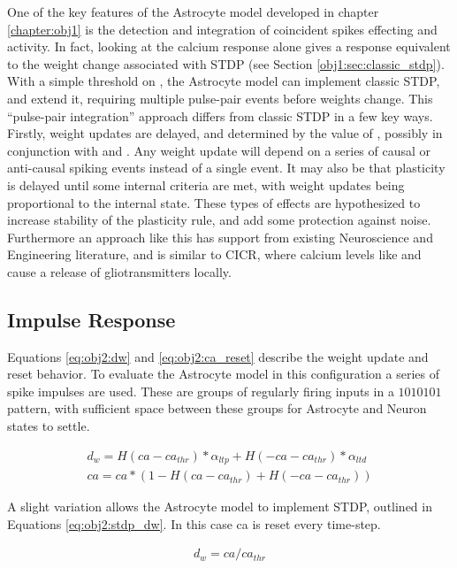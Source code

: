 One of the key features of the Astrocyte model developed in chapter
\ref{chapter:obj1} is the detection and integration of coincident spikes
effecting \ipt and \kp activity. In fact, looking at the calcium response alone
gives a response equivalent to the weight change associated with STDP (see
Section \ref{obj1:sec:classic_stdp}). With a simple threshold on \ca, the
Astrocyte model can implement classic STDP, and extend it, requiring multiple
pulse-pair events before weights change. This ``pulse-pair 
integration'' approach differs from classic STDP in a few key ways. Firstly,
weight updates are delayed, and determined by the value of \ca, possibly in
conjunction with \ipt and \kp. Any weight update will depend on a series of
causal or anti-causal spiking events instead of a single event. It may also be
that plasticity is delayed until some internal criteria are met, with weight
updates being proportional to the internal state. These types of effects are
hypothesized to increase stability of the plasticity rule, and add some
protection against noise. Furthermore an approach like this has support from
existing Neuroscience and Engineering literature, and is similar to CICR, where
calcium levels like and cause a release of gliotransmitters locally.

\subsection{Impulse Response}
Equations \ref{eq:obj2:dw} and \ref{eq:obj2:ca_reset}
describe the weight update and \ca reset behavior. To evaluate the Astrocyte
model in this configuration a series of spike impulses are used. These are
groups of regularly firing inputs in a $1010101$ pattern, with sufficient space
between these groups for Astrocyte and Neuron states to settle.

\begin{align}
  d_w = H(ca - ca_{thr}) * \alpha_{ltp} + H(-ca - ca_{thr}) *
  \alpha_{ltd} \label{eq:obj2:dw} \\
  ca = ca * (1 - H(ca - ca_{thr}) +  H(-ca - ca_{thr})) \label{eq:obj2:ca_reset}
\end{align}

A slight variation allows the Astrocyte model to implement STDP, outlined in
Equations \ref{eq:obj2:stdp_dw}. In this case ca is reset every time-step.

\begin{align}
  d_w = ca / ca_{thr} \label{eq:obj2:stdp_dw} \\
\end{align}

